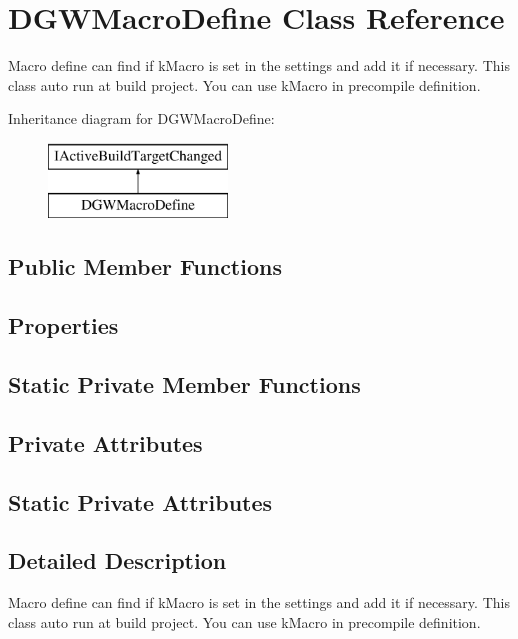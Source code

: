 \hypertarget{classDoxygenGeneratorWindow_1_1DGWMacroDefine}{}\section{D\+G\+W\+Macro\+Define Class Reference}
\label{classDoxygenGeneratorWindow_1_1DGWMacroDefine}


Macro define can find if k\+Macro is set in the settings and add it if necessary. This class auto run at build project. You can use k\+Macro in precompile definition.  


Inheritance diagram for D\+G\+W\+Macro\+Define\+:\begin{figure}[H]
\begin{center}
\leavevmode
\includegraphics[height=2.000000cm]{d4/d80/classDoxygenGeneratorWindow_1_1DGWMacroDefine}
\end{center}
\end{figure}
\subsection*{Public Member Functions}
\subsection*{Properties}
\subsection*{Static Private Member Functions}
\subsection*{Private Attributes}
\subsection*{Static Private Attributes}


\subsection{Detailed Description}
Macro define can find if k\+Macro is set in the settings and add it if necessary. This class auto run at build project. You can use k\+Macro in precompile definition. 



